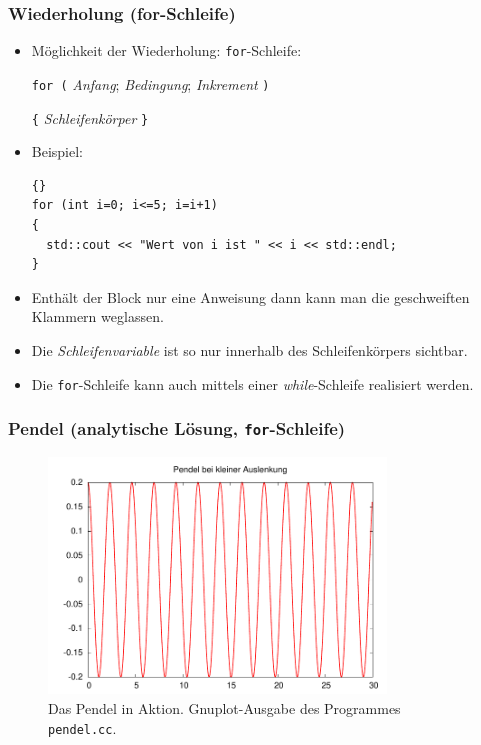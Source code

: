 \documentclass[ignorenonframetext,12pt]{beamer}
\theoremstyle{definition}
\theoremstyle{definition}
\begin{document}
\begin{frame}[fragile]
\frametitle{Wiederholung (for-Schleife)}
\begin{itemize}
\item Möglichkeit der Wiederholung: \lstinline{for}-Schleife:

\lstinline{for (} \textsl{Anfang}; \textsl{Bedingung};
\textsl{Inkrement} \lstinline{)}

\lstinline!{! \textsl{Schleifenkörper} \lstinline!}!
\item Beispiel:
{\scriptsize\begin{lstlisting}{}
for (int i=0; i<=5; i=i+1)
{
  std::cout << "Wert von i ist " << i << std::endl;
}
\end{lstlisting}}
\item Enthält der Block nur eine Anweisung dann kann man die
  geschweiften Klammern weglassen.
\item Die \textsl{Schleifenvariable} ist so nur innerhalb des
  Schleifenkörpers sichtbar.
\item Die \lstinline{for}-Schleife kann auch mittels einer
  \textsl{while}-Schleife realisiert werden.
\end{itemize}
\end{frame}

\begin{frame}[fragile]
\frametitle{Pendel (analytische Lösung, \lstinline{for}-Schleife)}

\end{frame}

 {
  \begin{figure}
    \begin{center}
      \includegraphics[width=0.8\textwidth]{./pendel}
    \end{center}
    \caption{Das Pendel in Aktion. Gnuplot-Ausgabe des Programmes \lstinline{pendel.cc}.}
    \label{programmierkurs:fig:pendel}
  \end{figure}
}
\end{document}
